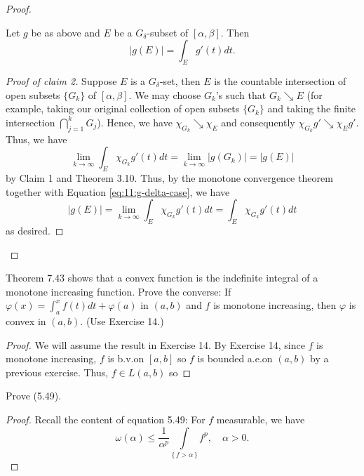 \begin{proof}
\begin{claim}
Let $g$ be as above and $E$ be a $G_\delta$-subset of
$[\alpha,\beta]$. Then
\[
|g(E)|=\int_E g'(t)dt.
\]
\end{claim}
\begin{proof}[Proof of claim 2]
\renewcommand\qedsymbol{$\clubsuit$}
Suppose $E$ is a $G_\delta$-set, then $E$ is the countable intersection of
open subsets $\{G_k\}$ of $[\alpha,\beta]$. We may choose $G_k$'s such that
$G_k\searrow E$ (for example, taking our original collection of open
subsets $\{G_k\}$ and taking the finite intersection $\bigcap_{j=1}^k
G_j$). Hence, we have $\chi_{G_k}\searrow\chi_E$ and consequently
$\chi_{G_k}g'\searrow\chi_Eg'$. Thus, we have
\begin{equation}
\label{eq:11:g-delta-case}
\lim_{k\to\infty}\int_E\chi_{G_k}g'(t)dt
=\lim_{k\to\infty}|g(G_k)|
=|g(E)|
\end{equation}
by Claim 1 and Theorem 3.10. Thus, by the monotone convergence theorem
together with Equation \eqref{eq:11:g-delta-case}, we have
\begin{equation}
\label{eq:11:apply-mct}
|g(E)|=\lim_{k\to\infty}\int_E\chi_{G_k}g'(t)dt=\int_E\chi_{G_k}g'(t)dt
\end{equation}
as desired.
\end{proof}
\begin{claim}

\end{claim}
\end{proof}
\newpage

\begin{problem}
Theorem 7.43 shows that a convex function is the indefinite integral of a
monotone increasing function. Prove the converse: If
$\varphi(x)=\int_a^xf(t)dt+\varphi(a)$ in $(a,b)$ and $f$ is monotone
increasing, then $\varphi$ is convex in $(a,b)$. (Use Exercise 14.)
\end{problem}
\begin{proof}
We will assume the result in Exercise 14. By Exercise 14, since $f$ is
monotone increasing, $f$ is b.v.\@ on $[a,b]$ so $f$ is bounded a.e.\@ on
$(a,b)$ by a previous exercise. Thus, $f\in L(a,b)$ so
\end{proof}
\newpage

\begin{problem}
Prove (5.49).
\end{problem}
\begin{proof}
Recall the content of equation 5.49: For $f$ measurable, we have
\begin{equation}
  \label{eq:11:chebyshevs-inequality}
\omega(\alpha)\leq\frac{1}{\alpha^p}\int\limits_{\{\,f>\alpha\,\}}f^p,\quad\alpha>0.
\end{equation}
\end{proof}
\newpage

